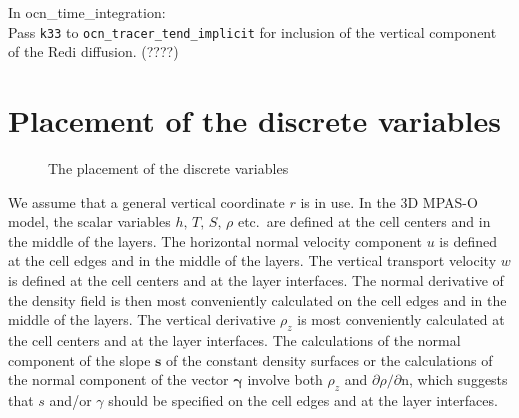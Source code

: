 \documentclass[12pt]{report}
\def\p{\partial}
\def\bs{\boldsymbol}
\begin{document}
\vspace{5mm}
\noindent In ocn\_time\_integration:\\
Pass {\tt k33} to {\tt ocn\_tracer\_tend\_implicit} for inclusion of the vertical
component of the Redi diffusion. (????)



\section{Placement of the discrete variables}\label{sec:plac-discr-vari}
\begin{figure}[h]
  \centering
  \caption{The placement of the discrete variables}
  \label{fig:1}
\end{figure}
We assume that a general vertical coordinate $r$ is in use. In the 3D
MPAS-O model, the scalar variables $h,\, T,\, S,\, \rho$ etc.~are
defined at the cell centers and in the middle of the layers. The
horizontal normal velocity component $u$ is defined at the cell edges
and in the middle of the layers. The vertical transport velocity $w$
is defined at the cell centers and at the layer interfaces. The normal
derivative of the density field is then most conveniently calculated
on the cell edges and in the middle of the layers. The vertical
derivative $\rho_z$ is most conveniently calculated at the cell
centers and at the layer interfaces. The calculations of the normal
component of the slope $\bs{s}$ of the constant density surfaces or
the calculations of the normal component of the vector $\bs{\gamma}$
involve both $\rho_z$ and $\p\rho/\p\mathrm{n}$, which suggests that
$s$ and/or $\gamma$ should be specified on the cell edges and at the
layer interfaces. 
\end{document}
